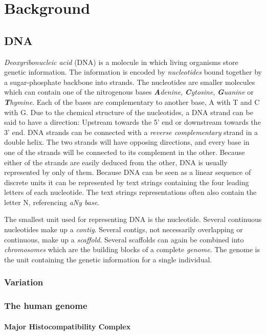 \documentclass[thesis.tex]{subfiles}
\begin{document}
\chapter{Background}
\section{DNA}
\textit{Deoxyribonucleic acid} (DNA) is a molecule in which living organisms store genetic information. The information is encoded by \textit{nucleotides} bound together by a sugar-phosphate backbone into strands. The nucleotides are smaller molecules which can contain one of the nitrogenous bases \textit{\textbf{A}denine}, \textit{\textbf{C}ytosine}, \textit{\textbf{G}uanine} or \textit{\textbf{T}hymine}. Each of the bases are complementary to another base, A with T and C with G. Due to the chemical structure of the nucleotides, a DNA strand can be said to have a direction: Upstream towards the 5' end or downstream towards the 3' end. DNA strands can be connected with a \textit{reverse complementary} strand in a double helix. The two strands will have opposing directions, and every base in one of the strands will be connected to its complement in the other. Because either of the strands are easily deduced from the other, DNA is usually represented by only of them. Because DNA can be seen as a linear sequence of discrete units it can be represented by text strings containing the four leading letters of each nucleotide. The text strings representations often also contain the letter N, referencing \textit{aNy base}.
\par\noindent
The smallest unit used for representing DNA is the nucleotide. Several continuous nucleotides make up a \textit{contig}. Several contigs, not necessarily overlapping or continuous, make up a \textit{scaffold}. Several scaffolds can again be combined into \textit{chromosomes} which are the building blocks of a complete \textit{genome}. The genome is the unit containing the genetic information for a single individual.
\subsection{Variation}

\subsection{The human genome}
\subsubsection{Major Histocompatibility Complex}
\end{document}
